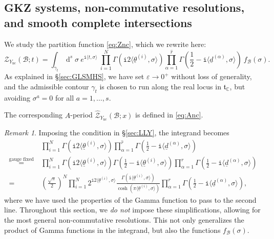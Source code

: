\documentclass[12pt,a4paper,oneside]{amsart}
\numberwithin{equation}{section}
\theoremstyle{definition}
\theoremstyle{remark}
\newtheorem{rmk}[thm]{Remark}
\DeclareMathOperator{\C}{\mathbb{C}}
\DeclareMathOperator{\dd}{d}
\newcommand{\mz}{\mathcal{Z}}
\newcommand{\Br}{\mathcal{B}}
\newcommand{\Ync}{Y_{\mathrm{nc}}}
\newcommand{\pz}{\widehat{\mathcal{Z}}}
\newcommand{\ii}{\mathtt{i}}
\begin{document}
\subsection{GKZ systems, non-commutative resolutions, and smooth complete intersections}
\label{sec:GLSMGKZderivation}
We study the partition function \eqref{eq:Znc}, which we rewrite here:
\begin{equation}
\label{eq:ZYncGLSM}
	\mz_{\Ync} \left( \Br; t \right) = \int_{\gamma_t} \dd^s \sigma~e^{\ii \langle t, \sigma\rangle } ~\prod_{i=1}^{N} \Gamma \left( \ii 2 \langle \underline{\theta}^{(i)}, \sigma \rangle \right) \prod_{\alpha=1}^{\hat{r}} \Gamma \left( \frac{1}{2} - \ii \langle\underline{d}^{(\alpha)}, \sigma \rangle \right) ~f_{\Br} (\sigma) .
\end{equation}
As explained in \S\ref{sec:GLSMHS}, we have set $\varepsilon \to 0^{+}$ without loss of generality, and the admissible contour $\gamma_t$ is chosen to run along the real locus in $\mathfrak{t}_{\C}$, but avoiding $\sigma^{a}=0$ for all $a=1, \dots, s$.\par
The corresponding $A$-period $\pz_{\Ync} \left( \Br; x \right)$ is defined in \eqref{eq:Anc}.\par
\begin{rmk}
    Imposing the condition in \S\ref{sec:LLY}, the integrand becomes 
\begin{equation*}
\begin{aligned}
    & \prod_{i=1}^{N} \Gamma \left( \ii 2 \langle \underline{\theta}^{(i)}, \sigma \rangle \right) \prod_{\alpha=1}^{\hat{r}} \Gamma \left( \frac{1}{2} - \ii \langle\underline{d}^{(\alpha)}, \sigma \rangle \right) \\ 
    \stackrel{\text{gauge fixed}}{=} \ & \prod_{i=1}^{N} \Gamma \left( \ii 2 \langle \underline{\theta}^{(i)}, \sigma \rangle \right) \Gamma \left( \frac{1}{2} - \ii \langle\underline{\theta}^{(i)}, \sigma \rangle \right) \prod_{\alpha=1}^{r} \Gamma \left( \frac{1}{2} - \ii \langle\underline{d}^{(\alpha)}, \sigma \rangle \right) \\
    =& \left(\frac{\sqrt{\pi}}{2} \right)^N \prod_{i=1}^{N} 2^{ \ii 2 \langle \underline{\theta}^{(i)}, \sigma \rangle} \frac{\Gamma \left( \ii \langle \underline{\theta}^{(i)}, \sigma \rangle \right)}{\cosh  \left( \pi \langle\underline{\theta}^{(i)}, \sigma \rangle \right)} \prod_{\alpha=1}^{r} \Gamma \left( \frac{1}{2} - \ii \langle\underline{d}^{(\alpha)}, \sigma \rangle \right) ,
\end{aligned}
\end{equation*}
where we have used the properties of the Gamma function to pass to the second line. Throughout this section, we \emph{do not} impose these simplifications, allowing for the most general non-commutative resolutions. This not only generalizes the product of Gamma functions in the integrand, but also the functions $f_{\Br} (\sigma)$.
\end{rmk}
\end{document}
